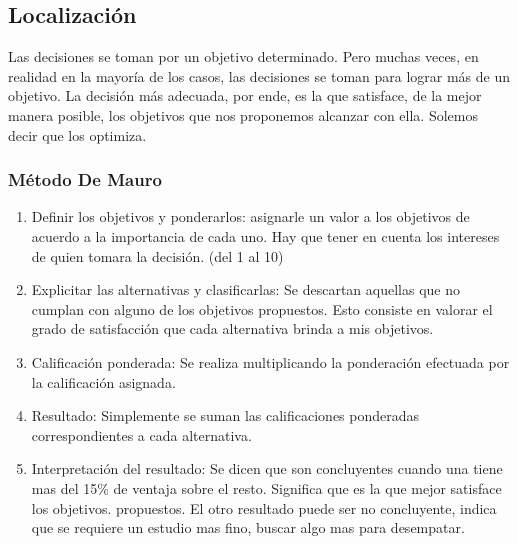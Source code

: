 \documentclass[titlepage,a4paper]{article}
\begin{document}
\subsection{Localización}
Las decisiones se toman por un objetivo determinado. Pero muchas veces, en realidad en la mayoría de los casos, las decisiones se toman para lograr más de un objetivo. La decisión más adecuada, por ende, es la que satisface, de la mejor manera posible, los objetivos que nos proponemos alcanzar con ella. Solemos decir que los optimiza.

\subsubsection*{Método De Mauro}
\begin{enumerate}
    \item Definir los objetivos y ponderarlos: asignarle un valor a los objetivos de acuerdo a la importancia de cada uno. Hay que tener en cuenta los intereses de quien tomara la decisión. (del 1 al 10)
    \item Explicitar las alternativas y clasificarlas: Se descartan aquellas que no cumplan con alguno de los objetivos propuestos. Esto consiste en valorar el grado de satisfacción que cada alternativa brinda a mis objetivos.
    \item Calificación ponderada: Se realiza multiplicando la ponderación efectuada por la calificación asignada.
    \item Resultado: Simplemente se suman las calificaciones ponderadas correspondientes a cada alternativa.
    \item Interpretación del resultado: Se dicen que son concluyentes cuando una tiene mas del 15\% de ventaja sobre el resto. Significa que es la que mejor satisface los objetivos. propuestos. El otro resultado puede ser no concluyente, indica que se requiere un estudio mas fino, buscar algo mas para desempatar.
\end{enumerate}
\end{document}
